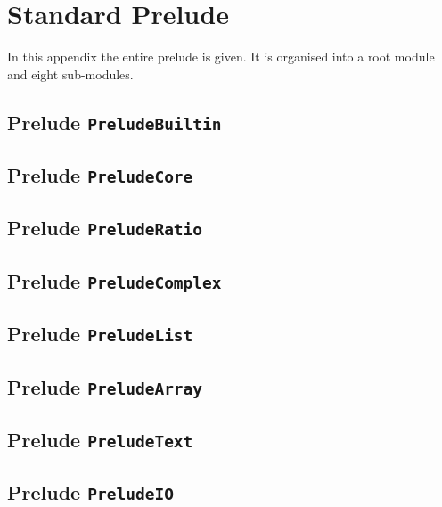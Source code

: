 %
%
\section{Standard Prelude}
\label{stdprelude}

In this appendix the entire \Haskell{} prelude is given.  It is
organised into a root module and eight sub-modules.

\medskip
\clearpage

\subsection{Prelude {\tt PreludeBuiltin}}
\label{preludebuiltin}
\clearpage

\subsection{Prelude {\tt PreludeCore}}
\label{preludecore}
%
%
\clearpage

\subsection{Prelude {\tt PreludeRatio}}
\label{preluderatio}
\clearpage

\subsection{Prelude {\tt PreludeComplex}}
\label{preludecomplex}
\clearpage

\subsection{Prelude {\tt PreludeList}}
\label{preludelist}
\clearpage

\subsection{Prelude {\tt PreludeArray}}
\label {preludearray}
\clearpage

\subsection{Prelude {\tt PreludeText}}
\label{preludetext}
\clearpage

\subsection{Prelude {\tt PreludeIO}}
\label{preludeio}


